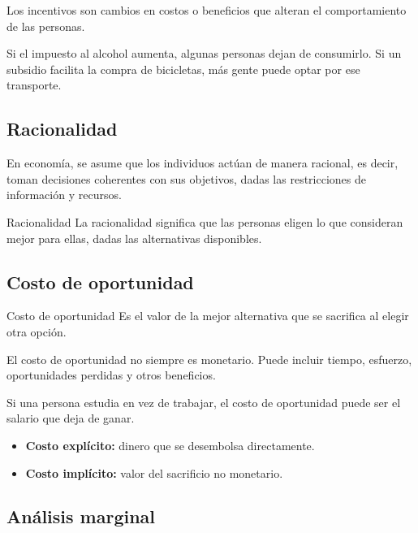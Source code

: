Los incentivos son cambios en costos o beneficios que alteran el comportamiento de las personas.

\begin{ejemplo}
Si el impuesto al alcohol aumenta, algunas personas dejan de consumirlo. Si un subsidio facilita la compra de bicicletas, más gente puede optar por ese transporte.
\end{ejemplo}

\subsection{Racionalidad}

En economía, se asume que los individuos actúan de manera racional, es decir, toman decisiones coherentes con sus objetivos, dadas las restricciones de información y recursos.

\begin{concepto}{Racionalidad}
La racionalidad significa que las personas eligen lo que consideran mejor para ellas, dadas las alternativas disponibles.
\end{concepto}

\subsection{Costo de oportunidad}

\begin{concepto}{Costo de oportunidad}
Es el valor de la mejor alternativa que se sacrifica al elegir otra opción.
\end{concepto}

El costo de oportunidad no siempre es monetario. Puede incluir tiempo, esfuerzo, oportunidades perdidas y otros beneficios.

\begin{ejemplo}
Si una persona estudia en vez de trabajar, el costo de oportunidad puede ser el salario que deja de ganar.
\end{ejemplo}

\begin{itemize}
    \item \textbf{Costo explícito:} dinero que se desembolsa directamente.
    \item \textbf{Costo implícito:} valor del sacrificio no monetario.
\end{itemize}

\subsection{Análisis marginal}

